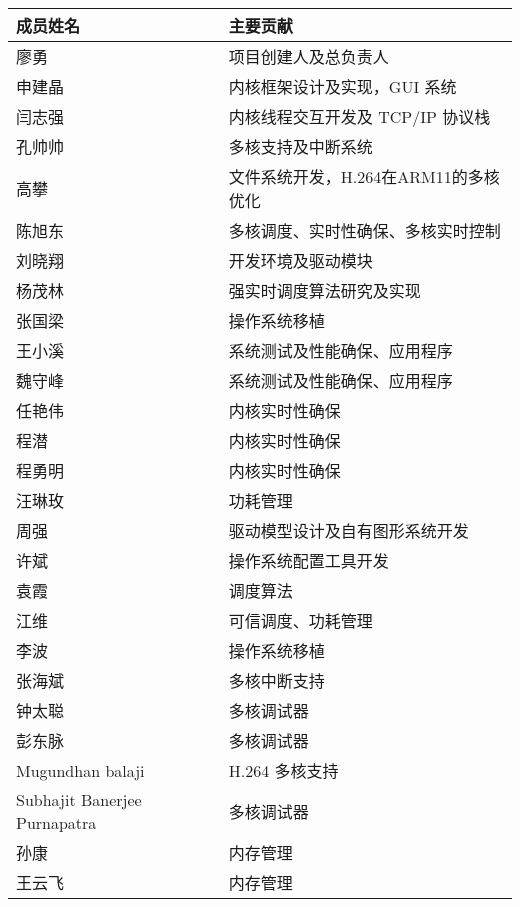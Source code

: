 \begin{center}
    \setlength\tabcolsep{2pt}
    \begin{longtable}{|p{12em}<{\centering}|p{17em}<{\centering}|}
        \hline  成员姓名 & 主要贡献  \\
        \hline  廖勇 & 项目创建人及总负责人 \\
        \hline  申建晶 & 内核框架设计及实现，GUI 系统 \\
        \hline  闫志强 & 内核线程交互开发及 TCP/IP 协议栈 \\
        \hline  孔帅帅 & 多核支持及中断系统 \\
        \hline  高攀 & 文件系统开发，H.264在ARM11的多核优化 \\
        \hline  陈旭东 & 多核调度、实时性确保、多核实时控制 \\
        \hline  刘晓翔 & 开发环境及驱动模块 \\
        \hline  杨茂林 & 强实时调度算法研究及实现 \\
        \hline  张国梁 & 操作系统移植 \\
        \hline  王小溪 & 系统测试及性能确保、应用程序 \\
        \hline  魏守峰 & 系统测试及性能确保、应用程序 \\
        \hline  任艳伟 & 内核实时性确保 \\
        \hline  程潜 & 内核实时性确保 \\
        \hline  程勇明 & 内核实时性确保 \\
        \hline  汪琳玫 & 功耗管理 \\
        \hline  周强 & 驱动模型设计及自有图形系统开发 \\
        \hline  许斌 & 操作系统配置工具开发 \\
        \hline  袁霞 & 调度算法 \\
        \hline  江维 & 可信调度、功耗管理 \\
        \hline  李波 & 操作系统移植 \\
        \hline  张海斌 & 多核中断支持 \\
        \hline  钟太聪 & 多核调试器 \\
        \hline  彭东脉 & 多核调试器 \\
        \hline  Mugundhan balaji & H.264 多核支持 \\
        \hline  Subhajit Banerjee Purnapatra & 多核调试器 \\
        \hline  孙康 & 内存管理 \\
        \hline  王云飞 & 内存管理 \\

\end{longtable}
\end{center}
